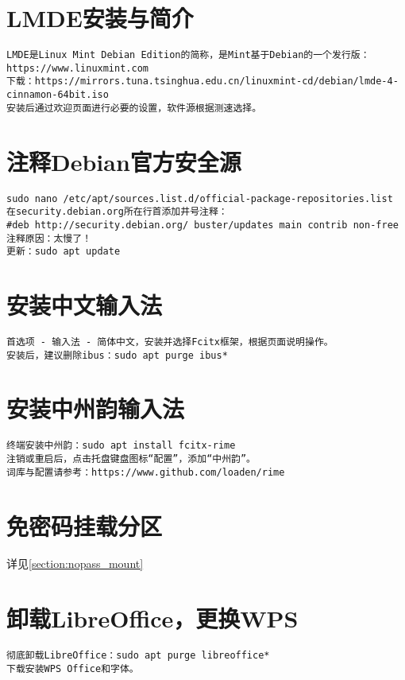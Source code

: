 \documentclass[a4paper,fontset=fandol,zihao=-4,linespread=1.2,oneside]{ctexbook}
\begin{document}
\section{LMDE安装与简介}
\begin{lstlisting}
LMDE是Linux Mint Debian Edition的简称，是Mint基于Debian的一个发行版：https://www.linuxmint.com
下载：https://mirrors.tuna.tsinghua.edu.cn/linuxmint-cd/debian/lmde-4-cinnamon-64bit.iso
安装后通过欢迎页面进行必要的设置，软件源根据测速选择。
\end{lstlisting}

\section{注释Debian官方安全源}
\begin{lstlisting}
sudo nano /etc/apt/sources.list.d/official-package-repositories.list
在security.debian.org所在行首添加井号注释：
#deb http://security.debian.org/ buster/updates main contrib non-free
注释原因：太慢了！
更新：sudo apt update
\end{lstlisting}

\section{安装中文输入法}
\begin{lstlisting}
首选项 - 输入法 - 简体中文，安装并选择Fcitx框架，根据页面说明操作。
安装后，建议删除ibus：sudo apt purge ibus*
\end{lstlisting}

\section{安装中州韵输入法} \label{section:fcitx_rime}
\begin{lstlisting}
终端安装中州韵：sudo apt install fcitx-rime
注销或重启后，点击托盘键盘图标“配置”，添加“中州韵”。
词库与配置请参考：https://www.github.com/loaden/rime
\end{lstlisting}

\section{免密码挂载分区}
详见\ref{section:nopass_mount}

\section{卸载LibreOffice，更换WPS}
\begin{lstlisting}
彻底卸载LibreOffice：sudo apt purge libreoffice*
下载安装WPS Office和字体。
\end{lstlisting}
\end{document}
